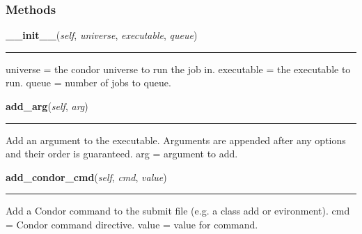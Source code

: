   \subsubsection{Methods}

    \label{pipeline:CondorJob:__init__}
    \vspace{0.5ex}

    \noindent\begin{boxedminipage}{\textwidth}

    \raggedright \textbf{\_\_init\_\_}(\textit{self}, \textit{universe}, \textit{executable}, \textit{queue})

    \vspace{-1.5ex}

    \rule{\textwidth}{0.5\fboxrule}
    universe = the condor universe to run the job in. executable = the 
    executable to run. queue = number of jobs to queue.

    \vspace{1ex}

    \end{boxedminipage}

    \label{pipeline:CondorJob:add_arg}
    \vspace{0.5ex}

    \noindent\begin{boxedminipage}{\textwidth}

    \raggedright \textbf{add\_arg}(\textit{self}, \textit{arg})

    \vspace{-1.5ex}

    \rule{\textwidth}{0.5\fboxrule}
    Add an argument to the executable. Arguments are appended after any 
    options and their order is guaranteed. arg = argument to add.

    \vspace{1ex}

    \end{boxedminipage}

    \label{pipeline:CondorJob:add_condor_cmd}
    \vspace{0.5ex}

    \noindent\begin{boxedminipage}{\textwidth}

    \raggedright \textbf{add\_condor\_cmd}(\textit{self}, \textit{cmd}, \textit{value})

    \vspace{-1.5ex}

    \rule{\textwidth}{0.5\fboxrule}
    Add a Condor command to the submit file (e.g. a class add or 
    evironment). cmd = Condor command directive. value = value for 
    command.

    \vspace{1ex}

    \end{boxedminipage}

